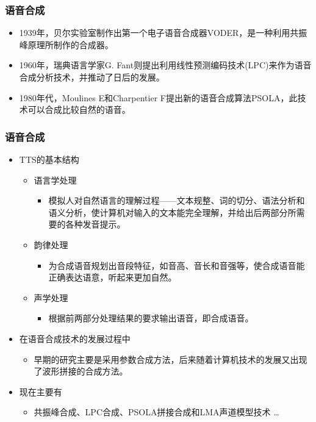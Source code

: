 \documentclass{beamer}
\begin{document}
\begin{frame}
	\frametitle{语音合成}
	\beamertemplatetransparentcovereddynamicmedium
	\begin{itemize}[<+->]
		\item 1939年，贝尔实验室制作出第一个电子语音合成器VODER，是一种利用共振峰原理所制作的合成器。
		\item 1960年，瑞典语言学家G. Fant则提出利用线性预测编码技术(LPC)来作为语音合成分析技术，并推动了日后的发展。
		\item 1980年代，Moulines E和Charpentier F提出新的语音合成算法PSOLA，此技术可以合成比较自然的语音。
	\end{itemize}
\end{frame}

\begin{frame}
	\frametitle{语音合成}
	\beamertemplatetransparentcovereddynamicmedium
	\begin{itemize}
		\item TTS的基本结构
		\pause
		\begin{itemize}
			\item 语言学处理
			\begin{itemize}
				\item 模拟人对自然语言的理解过程——文本规整、词的切分、语法分析和语义分析，使计算机对输入的文本能完全理解，并给出后两部分所需要的各种发音提示。
			\end{itemize}
			\pause
			\item 韵律处理
			\begin{itemize}
				\item 为合成语音规划出音段特征，如音高、音长和音强等，使合成语音能正确表达语意，听起来更加自然。
			\end{itemize}
			\pause
			\item 声学处理
			\begin{itemize}
				\item 根据前两部分处理结果的要求输出语音，即合成语音。
			\end{itemize}
		\end{itemize}
		\pause
		\item 在语音合成技术的发展过程中
		\begin{itemize}
			\item 早期的研究主要是采用参数合成方法，后来随着计算机技术的发展又出现了波形拼接的合成方法。
		\end{itemize}
		\pause
		\item 现在主要有
		\begin{itemize}
			\item 共振峰合成、LPC合成、PSOLA拼接合成和LMA声道模型技术 \dots
		\end{itemize}
	\end{itemize}
\end{frame}
\end{document}
